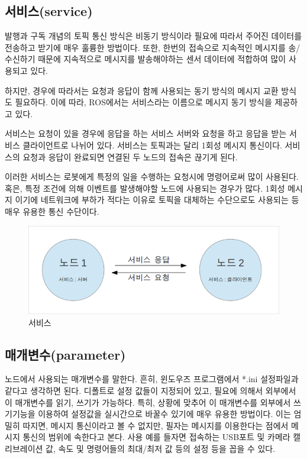 \subsection{서비스(service)}

발행과 구독 개념의 토픽 통신 방식은 비동기 방식이라 필요에 따라서 주어진 데이터를 전송하고 받기에 매우 훌륭한 방법이다. 또한, 한번의 접속으로 지속적인 메시지를 송/수신하기 때문에 지속적으로 메시지를 발송해야하는 센서 데이터에 적합하여 많이 사용되고 있다. 

하지만, 경우에 따라서는 요청과 응답이 함께 사용되는 동기 방식의 메시지 교환 방식도 필요하다. 이에 따라, ROS에서는 서비스라는 이름으로 메시지 동기 방식을 제공하고 있다. 

서비스는 요청이 있을 경우에 응답을 하는 서비스 서버와 요청을 하고 응답을 받는 서비스 클라이언트로 나뉘어 있다. 서비스는 토픽과는 달리 1회성 메시지 통신이다. 서비스의 요청과 응답이 완료되면 연결된 두 노드의 접속은 끊기게 된다. 

이러한 서비스는 로봇에게 특정의 일을 수행하는 요청시에 명령어로써 많이 사용된다. 혹은, 특정 조건에 의해 이벤트를 발생해야할 노드에 사용되는 경우가 많다. 1회성 메시지 이기에 네트워크에 부하가 적다는 이유로 토픽을 대체하는 수단으로도 사용되는 등 매우 유용한 통신 수단이다.

\begin{figure}[h]
\centering\includegraphics[width=0.5\columnwidth]{pictures/chapter7/msgtrans3.png}
\caption{서비스}
\end{figure}

\subsection{매개변수(parameter)}

노드에서 사용되는 매개변수를 말한다. 흔히, 윈도우즈 프로그램에서 *.ini 설정파일과 같다고 생각하면 된다. 디폴트로 설정 값들이 지정되어 있고, 필요에 의해서 외부에서 이 매개변수를 읽기, 쓰기가 가능하다. 특히, 상황에 맞추어 이 매개변수를 외부에서 쓰기기능을 이용하여 설정값을 실시간으로 바꿀수 있기에 매우 유용한 방법이다. 이는 엄밀히 따지면, 메시지 통신이라고 볼 수 없지만, 필자는 메시지를 이용한다는 점에서 메시지 통신의 범위에 속한다고 본다. 사용 예를 들자면 접속하는 USB포트 및 카메라 캘리브레이션 값, 속도 및 명령어들의 최대/최저 값 등의 설정 등을 꼽을 수 있다.

